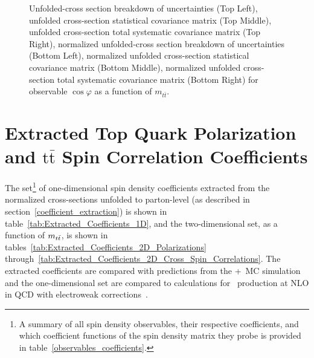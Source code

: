 \begin{figure}[htb]
\begin{center}
\caption{Unfolded-cross section breakdown of uncertainties (Top Left), unfolded cross-section statistical covariance matrix (Top Middle), unfolded cross-section total systematic covariance matrix (Top Right), normalized unfolded-cross section breakdown of uncertainties (Bottom Left), normalized unfolded cross-section statistical covariance matrix (Bottom Middle), normalized unfolded cross-section total systematic covariance matrix (Bottom Right) for  observable $\cos\varphi$ as a function of $m_{t\bar{t}}$.}
\label{fig:ll_cHel_mttbar_uncertainties}
\end{center}
\end{figure}
\clearpage




\section{Extracted Top Quark Polarization and \ensuremath{\mathrm{t\bar{t}}} Spin Correlation Coefficients}
The set\footnote{A summary of all spin density observables, their respective coefficients, and which coefficient functions of the spin density matrix they probe is provided in table~\ref{observables_coefficients}.} of one-dimensional spin density coefficients extracted from the normalized cross-sections unfolded to parton-level (as described in section~\ref{coefficient_extraction}) is shown in table~\ref{tab:Extracted_Coefficients_1D}, and the two-dimensional set, as a function of $m_{t\bar{t}}$, is shown in tables~\ref{tab:Extracted_Coefficients_2D_Polarizations} through~\ref{tab:Extracted_Coefficients_2D_Cross_Spin_Correlations}.
The extracted coefficients are compared with predictions from the \Powheg+\Pythia\ MC simulation and the one-dimensional set are compared to calculations for \ttbar\ production at NLO in QCD with electroweak corrections~\cite{Bernreuther}.


